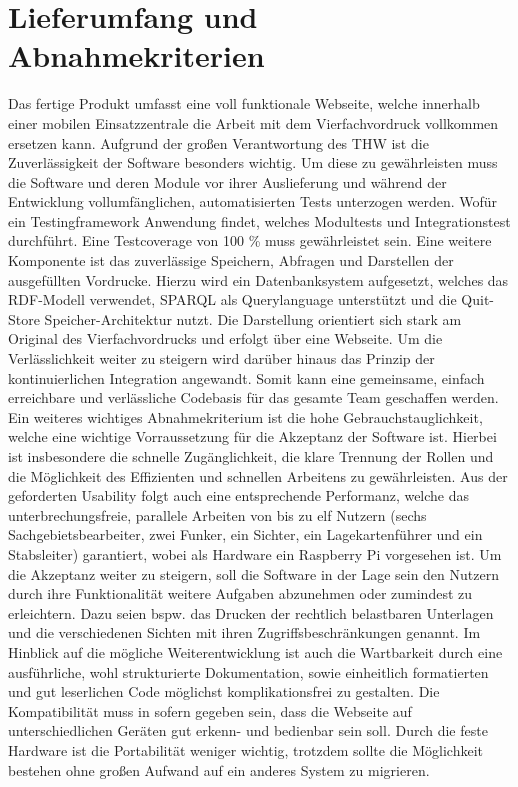 \section{Lieferumfang und Abnahmekriterien}
Das fertige Produkt umfasst eine voll funktionale Webseite, welche innerhalb einer mobilen Einsatzzentrale die Arbeit mit dem Vierfachvordruck vollkommen ersetzen kann. Aufgrund der großen Verantwortung des THW ist die Zuverlässigkeit der Software besonders wichtig. Um diese zu gewährleisten muss die Software und deren Module vor ihrer Auslieferung und während der Entwicklung vollumfänglichen, automatisierten Tests unterzogen werden. Wofür ein Testingframework Anwendung findet, welches Modultests und Integrationstest durchführt. Eine Testcoverage von 100 \% muss gewährleistet sein. Eine weitere Komponente ist das zuverlässige Speichern, Abfragen und Darstellen der ausgefüllten Vordrucke. Hierzu wird ein Datenbanksystem aufgesetzt, welches das RDF-Modell verwendet, SPARQL als Querylanguage unterstützt und die Quit-Store Speicher-Architektur nutzt. Die Darstellung orientiert sich stark am Original des Vierfachvordrucks und erfolgt über eine Webseite. Um die Verlässlichkeit weiter zu steigern wird darüber hinaus das Prinzip der kontinuierlichen Integration angewandt. Somit kann eine gemeinsame, einfach erreichbare und verlässliche Codebasis für das gesamte Team geschaffen werden. Ein weiteres wichtiges Abnahmekriterium ist die hohe Gebrauchstauglichkeit, welche eine wichtige Vorraussetzung für die Akzeptanz der Software ist. Hierbei ist insbesondere die schnelle Zugänglichkeit, die klare Trennung der Rollen und die Möglichkeit des Effizienten und schnellen Arbeitens zu gewährleisten. Aus der geforderten Usability folgt auch eine entsprechende Performanz, welche das unterbrechungsfreie, parallele Arbeiten von bis zu elf Nutzern (sechs Sachgebietsbearbeiter, zwei Funker, ein Sichter, ein Lagekartenführer und ein Stabsleiter) garantiert, wobei als Hardware ein Raspberry Pi vorgesehen ist. Um die Akzeptanz weiter zu steigern, soll die Software in der Lage sein den Nutzern durch ihre Funktionalität weitere Aufgaben abzunehmen oder zumindest zu erleichtern. Dazu seien bspw. das Drucken der rechtlich belastbaren Unterlagen und die verschiedenen Sichten mit ihren Zugriffsbeschränkungen genannt. Im Hinblick auf die mögliche Weiterentwicklung ist auch die Wartbarkeit durch eine ausführliche, wohl strukturierte Dokumentation, sowie einheitlich formatierten und gut leserlichen Code möglichst komplikationsfrei zu gestalten. Die Kompatibilität muss in sofern gegeben sein, dass die Webseite auf unterschiedlichen Geräten gut erkenn- und bedienbar sein soll. Durch die feste Hardware ist die Portabilität weniger wichtig, trotzdem sollte die Möglichkeit bestehen ohne großen Aufwand auf ein anderes System zu migrieren. 